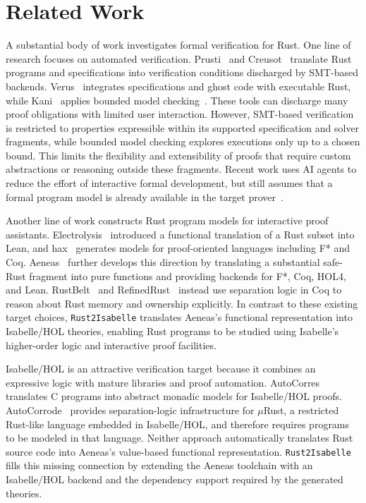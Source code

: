 \section{Related Work}
\label{sec:related}

A substantial body of work investigates formal verification for Rust. One line of research focuses on automated verification.
Prusti~\cite{astrauskas2019leveraging} and Creusot~\cite{denis2022creusot} translate Rust programs and specifications into verification conditions discharged by SMT-based backends.
Verus~\cite{lattuada2023verus} integrates specifications and ghost code with executable Rust, while Kani~\cite{kani} applies bounded model checking~\cite{vanhattum2022verifying}.
These tools can discharge many proof obligations with limited user interaction.
However, SMT-based verification is restricted to properties expressible within its supported specification and solver fragments, while bounded model checking explores executions only up to a chosen bound.
This limits the flexibility and extensibility of proofs that require custom abstractions or reasoning outside these fragments.
Recent work uses AI agents to reduce the effort of interactive formal development, but still assumes that a formal program model is already available in the target prover~\cite{fang2026trustworthy}.

Another line of work constructs Rust program models for interactive proof assistants.
Electrolysis~\cite{ullrich2016simple} introduced a functional translation of a Rust subset into Lean, and hax~\cite{bhargavan2024hax} generates models for proof-oriented languages including F* and Coq.
Aeneas~\cite{aeneas_project,ho2022aeneas} further develops this direction by translating a substantial safe-Rust fragment into pure functions and providing backends for F*, Coq, HOL4, and Lean.
RustBelt~\cite{jung2017rustbelt} and RefinedRust~\cite{gaher2024refinedrust} instead use separation logic in Coq to reason about Rust memory and ownership explicitly.
In contrast to these existing target choices, \texttt{Rust2Isabelle} translates Aeneas's functional representation into Isabelle/HOL theories, enabling Rust programs to be studied using Isabelle's higher-order logic and interactive proof facilities.

Isabelle/HOL is an attractive verification target because it combines an expressive logic with mature libraries and proof automation.
AutoCorres~\cite{greenaway2014don} translates C programs into abstract monadic models for Isabelle/HOL proofs.
AutoCorrode~\cite{autocorrode_aws} provides separation-logic infrastructure for \(\mu\)Rust, a restricted Rust-like language embedded in Isabelle/HOL, and therefore requires programs to be modeled in that language.
Neither approach automatically translates Rust source code into Aeneas's value-based functional representation.
\texttt{Rust2Isabelle} fills this missing connection by extending the Aeneas toolchain with an Isabelle/HOL backend and the dependency support required by the generated theories.